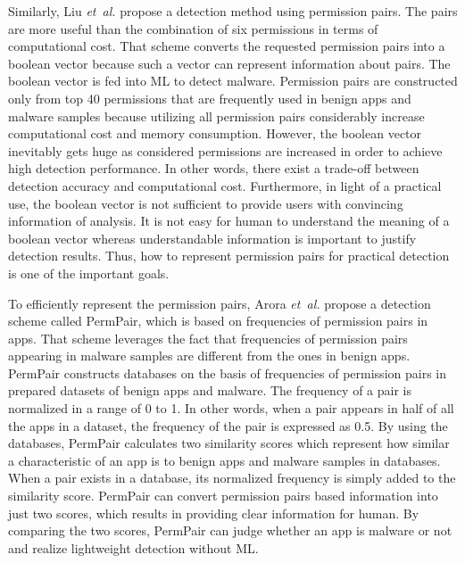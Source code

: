 \documentclass{ieeeaccess}
\newcommand{\etal}{\textit{et~al.}}
\begin{document}
Similarly, Liu \etal \cite{liu2014two} propose a detection method using permission pairs.
The pairs are more useful than the combination of six permissions in terms of computational cost.
That scheme converts the requested permission pairs into a boolean vector because such a vector can represent information about pairs.
The boolean vector is fed into ML to detect malware.
Permission pairs are constructed only from top 40 permissions that are frequently used in benign apps and malware samples because utilizing all permission pairs considerably increase computational cost and memory consumption.
However, the boolean vector inevitably gets huge as considered permissions are increased in order to achieve high detection performance.
In other words, there exist a trade-off between detection accuracy and computational cost.
Furthermore, in light of a practical use, the boolean vector is not sufficient to provide users with convincing information of analysis.
It is not easy for human to understand the meaning of a boolean vector whereas understandable information is important to justify detection results.
Thus, how to represent permission pairs for practical detection is one of the important goals.

To efficiently represent the permission pairs, Arora \etal \cite{arora2019permpair} propose a detection scheme called PermPair, which is based on frequencies of permission pairs in apps.
That scheme leverages the fact that frequencies of permission pairs appearing in malware samples are different from the ones in benign apps.
PermPair constructs databases on the basis of frequencies of permission pairs in prepared datasets of benign apps and malware.
The frequency of a pair is normalized in a range of 0 to 1.
In other words, when a pair appears in half of all the apps in a dataset, the frequency of the pair is expressed as 0.5.
By using the databases, PermPair calculates two similarity scores which represent how similar a characteristic of an app is to benign apps and malware samples in databases.
When a pair exists in a database, its normalized frequency is simply added to the similarity score.
PermPair can convert permission pairs based information into just two scores, which results in providing clear information for human.
By comparing the two scores, PermPair can judge whether an app is malware or not and realize lightweight detection without ML.
\end{document}
